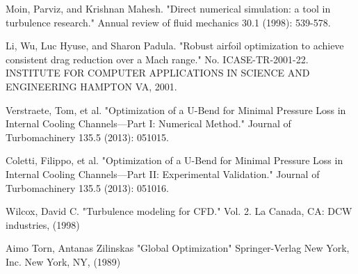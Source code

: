 \documentclass[a4paper,onecolumn]{article}
\theoremstyle{remark}
\begin{document}
\begin{thebibliography}{9}
Moin, Parviz, and Krishnan Mahesh. 
"Direct numerical simulation: a tool in turbulence research." 
Annual review of fluid mechanics 30.1 (1998): 539-578.

Li, Wu, Luc Hyuse, and Sharon Padula. 
"Robust airfoil optimization to achieve consistent drag reduction over a Mach range."
No. ICASE-TR-2001-22. INSTITUTE FOR COMPUTER APPLICATIONS IN SCIENCE AND ENGINEERING HAMPTON VA, 2001.

Verstraete, Tom, et al. 
"Optimization of a U-Bend for Minimal Pressure Loss in Internal Cooling Channels—Part I: Numerical Method." 
Journal of Turbomachinery 135.5 (2013): 051015.

Coletti, Filippo, et al. 
"Optimization of a U-Bend for Minimal Pressure Loss in Internal Cooling Channels—Part II: Experimental Validation." 
Journal of Turbomachinery 135.5 (2013): 051016.

Wilcox, David C. 
"Turbulence modeling for CFD." 
Vol. 2. La Canada, CA: DCW industries, (1998)

Aimo Torn, Antanas Zilinskas
"Global Optimization"
Springer-Verlag New York, Inc. New York, NY, (1989)


\end{thebibliography}
\end{document}
